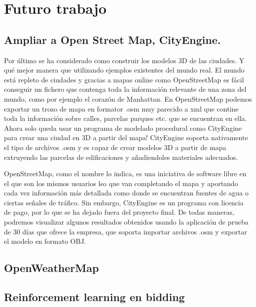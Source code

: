\documentclass[12pt,a4paper,openright,oneside]{article}
\numberwithin{equation}{section}
\theoremstyle{definition}
\begin{document}
\newpage



\section{Futuro trabajo}

\subsection{ Ampliar a Open Street Map, CityEngine.}
Por último se ha considerado como construir los modelos 3D de las ciudades. Y qué mejor manera que utilizando ejemplos existentes del mundo real. El mundo está repleto de ciudades y gracias a mapas online como OpenStreetMap es fácil conseguir un fichero que contenga toda la información relevante de una zona del mundo, como por ejemplo el corazón de Manhattan. En OpenStreetMap podemos exportar un trozo de mapa en formator .osm muy parecido a xml que contine toda la información sobre calles, parcelas parques etc. que se encuentran en ella. Ahora solo queda usar un programa de modelado procedural como CityEngine para crear una ciudad en 3D a partir del mapa! CityEngine soporta nativamente el tipo de archivos .osm y es capaz de crear modelos 3D a partir de mapa extruyendo las parcelas de edificaciones y añadiendoles materiales adecuados. 

OpenStreetMap, como el nombre lo indica, es una iniciativa de software libre en el que son los mismos usuarios lso que van completando el mapa y aportando cada vez información más detallada como donde se encuentran fuentes de agua o ciertas señales de tráfico. Sin embargo, CityEngine es un programa con licencia de pago, por lo que se ha dejado fuera del proyecto final. De todas maneras, podremos visualizar algunos resultados obtenidos usando la aplicación de prueba de 30 días que ofrece la empresa, que soporta importar archivos .osm y exportar el modelo en formato OBJ.


\subsection{OpenWeatherMap}

\subsection{Reinforcement learning en bidding}

\normalfont

\newpage
\end{document}
